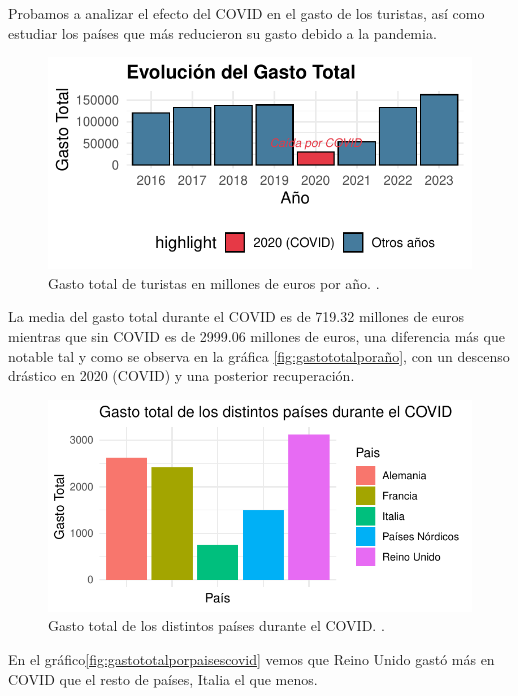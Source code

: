 \documentclass[data,article,submit,moreauthors,pdftex]{Definitions/mdpi}
\begin{document}
Probamos a analizar el efecto del COVID en el gasto de los turistas, así
como estudiar los países que más reducieron su gasto debido a la
pandemia.

\begin{figure}[H]
\includegraphics{ProyectoAED2024_Rmd_files/figure-latex/gasto total covid-1} \caption{Gasto total de turistas en millones de euros por año. .\label{fig:gastototalporaño}}\label{fig:gasto total covid}
\end{figure}

La media del gasto total durante el COVID es de 719.32 millones de euros
mientras que sin COVID es de 2999.06 millones de euros, una diferencia
más que notable tal y como se observa en la gráfica
\ref{fig:gastototalporaño}, con un descenso drástico en 2020 (COVID) y
una posterior recuperación.

\begin{figure}[H]
\includegraphics{ProyectoAED2024_Rmd_files/figure-latex/gasto paises covid-1} \caption{Gasto total de los distintos países durante el COVID. .\label{fig:gastototalporpaisescovid}}\label{fig:gasto paises covid}
\end{figure}

En el gráfico\ref{fig:gastototalporpaisescovid} vemos que Reino Unido
gastó más en COVID que el resto de países, Italia el que menos.
\end{document}
